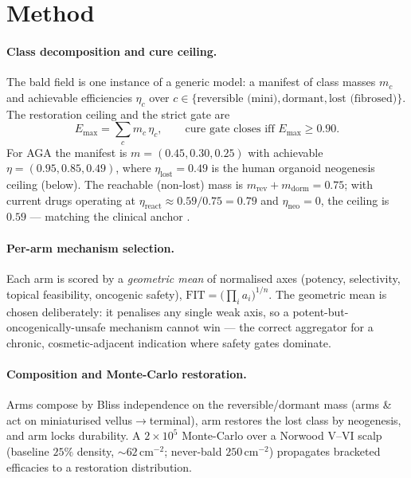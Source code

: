 \documentclass[11pt,a4paper]{article}
\newcommand{\arm}[1]{\raisebox{0.10ex}{\textcircled{\scriptsize #1}}}
\begin{document}
\section{Method}
\label{sec:method}
\paragraph{Class decomposition and cure ceiling.} The bald field is one instance of a
generic model: a manifest of class masses $m_c$ and achievable efficiencies $\eta_c$
over $c\in\{\text{reversible (mini)},\text{dormant},\text{lost (fibrosed)}\}$. The
restoration ceiling and the strict gate are
\begin{equation}
E_{\max}=\sum_{c} m_c\,\eta_c,
\qquad \text{cure gate closes iff } E_{\max}\geq 0.90 .
\label{eq:ceiling}
\end{equation}
For AGA the manifest is $m=(0.45,0.30,0.25)$ with achievable
$\eta=(0.95,0.85,0.49)$, where $\eta_{\text{lost}}=0.49$ is the human organoid
neogenesis ceiling (below). The reachable (non-lost) mass is
$m_{\text{rev}}+m_{\text{dorm}}=0.75$; with current drugs operating at
$\eta_{\text{react}}\!\approx\!0.59/0.75\!=\!0.79$ and $\eta_{\text{neo}}=0$, the
ceiling is $0.59$ --- matching the clinical anchor \citep{vanneste2020}.

\paragraph{Per-arm mechanism selection.} Each arm is scored by a \emph{geometric mean}
of normalised axes (potency, selectivity, topical feasibility, oncogenic safety),
$\mathrm{FIT}=\big(\prod_i a_i\big)^{1/n}$. The geometric mean is chosen deliberately:
it penalises any single weak axis, so a potent-but-oncogenically-unsafe mechanism
cannot win --- the correct aggregator for a chronic, cosmetic-adjacent indication where
safety gates dominate.

\paragraph{Composition and Monte-Carlo restoration.} Arms compose by Bliss independence
on the reversible/dormant mass (arms \arm{1}\&\arm{2} act on miniaturised vellus$\to$terminal),
arm\arm{4} restores the lost class by neogenesis, and arm\arm{3} locks durability. A $2\times10^{5}$
Monte-Carlo over a Norwood V--VI scalp (baseline $25\%$ density, $\sim\!62$\,cm$^{-2}$;
never-bald $250$\,cm$^{-2}$) propagates bracketed efficacies to a restoration
distribution.
\end{document}
